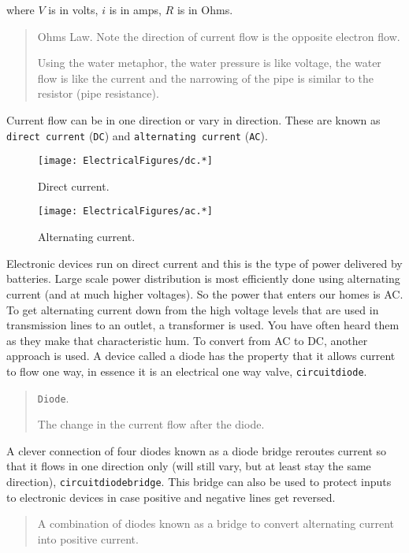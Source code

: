 where \(V\) is in volts, \(i\) is in amps, \(R\) is in Ohms.

\begin{quote}
Ohms Law. Note the direction of current flow is the opposite electron
flow.

Using the water metaphor, the water pressure is like voltage, the water
flow is like the current and the narrowing of the pipe is similar to the
resistor (pipe resistance).
\end{quote}

Current flow can be in one direction or vary in direction. These are
known as \texttt{direct\ current} (\texttt{DC}) and
\texttt{alternating\ current} (\texttt{AC}).

\begin{figure}
\centering
\texttt{[image: ElectricalFigures/dc.*]}
\caption{Direct current.}
\end{figure}

\begin{figure}
\centering
\texttt{[image: ElectricalFigures/ac.*]}
\caption{Alternating current.}
\end{figure}

Electronic devices run on direct current and this is the type of power
delivered by batteries. Large scale power distribution is most
efficiently done using alternating current (and at much higher
voltages). So the power that enters our homes is AC. To get alternating
current down from the high voltage levels that are used in transmission
lines to an outlet, a transformer is used. You have often heard them as
they make that characteristic hum. To convert from AC to DC, another
approach is used. A device called a diode has the property that it
allows current to flow one way, in essence it is an electrical one way
valve, \texttt{circuitdiode}.

\begin{quote}
\texttt{Diode}.

The change in the current flow after the diode.
\end{quote}

A clever connection of four diodes known as a diode bridge reroutes
current so that it flows in one direction only (will still vary, but at
least stay the same direction), \texttt{circuitdiodebridge}. This bridge
can also be used to protect inputs to electronic devices in case
positive and negative lines get reversed.

\begin{quote}
A combination of diodes known as a bridge to convert alternating current
into positive current.
\end{quote}

